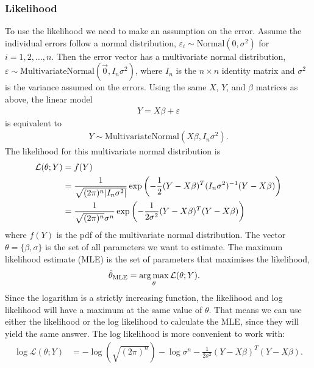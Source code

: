 \documentclass[a4paper]{article}
\begin{document}
\subsubsection{Likelihood}
To use the likelihood we need to make an assumption on the error.
Assume the individual errors follow a normal distribution,
$\varepsilon_i \sim \text{Normal}(0, \sigma^2)$ for $ i = 1 ,2 , \ldots , n $.
Then the error vector has a multivariate normal distribution, $\varepsilon \sim \text{MultivariateNormal}(\vec{0}, I_n \sigma^2)$,
where $I_n$ is the $n \times n$ identity matrix and $\sigma^2$ is the variance assumed on the errors. Using the same $X$, $Y$, and $\beta$ matrices as above, the linear model
\begin{align*}
  Y = X \beta + \varepsilon
\end{align*}
is equivalent to
\begin{align*}
  Y \sim \text{MultivariateNormal}(X \beta, I_n \sigma^2 )
  \text{.}
\end{align*}
The likelihood for this multivariate normal distribution is
\begin{align*}
\mathcal{L}(\theta;Y) &= f(Y) \\
&=
\frac{1}{\sqrt{(2\pi)^n \lvert I_n \sigma^2\rvert }}
\exp{
  \left(
  -\frac{1}{2}
   (Y-X\beta)^T  (I_n \sigma^2)^{-1} (Y - X \beta)
  \right)
} \\
&=
\frac{1}{\sqrt{(2\pi)^n  } \sigma^{n}}
\exp{
  \left(
  -\frac{1}{2 \sigma^2}
   (Y-X\beta)^T (Y-X\beta)
  \right)
}
\end{align*}
where $f(Y)$ is the pdf of the multivariate normal distribution.
The vector $\theta = \{ \beta, \sigma \}$ is the set of all parameters we want to estimate.
The maximum likelihood estimate (MLE) is the set of parameters that maximises the likelihood,
\begin{align}
\label{eq:regressiontheory:argmax}
\hat{\theta}_{\text{MLE}}
&=
\operatorname*{arg\,max}_{\theta}
\mathcal{L}(\theta;Y)
\text{.}
\end{align}
Since the logarithm is a strictly increasing function, the likelihood and log likelihood will have a maximum at the same value of $\theta$.
That means we can use either the likelihood or the log likelihood to calculate the MLE, since they will yield the same answer.
The log likelihood is more convenient to work with:
\begin{align*}
\log\mathcal{L}(\theta;Y)
&=
-\log\left(\sqrt{(2\pi)^n} \right)
-\log\sigma^{n}
  -\frac{1}{2 \sigma^2}
   (Y-X\beta)^T (Y-X\beta)
   \text{.}
\end{align*}
\end{document}
